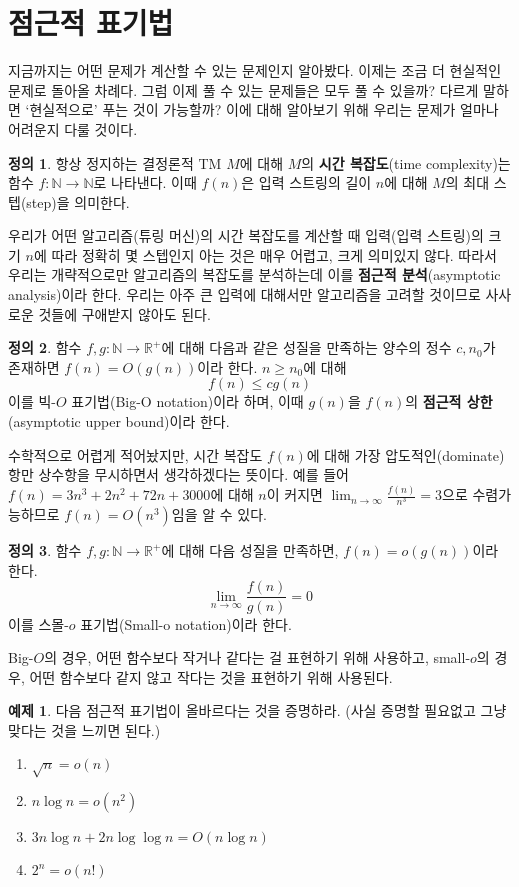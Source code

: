 \documentclass[b5paper]{book}
\theoremstyle{definition}
\newtheorem{defn}{정의}[chapter]
\newtheorem{ex}{예제}[chapter]
\begin{document}
\section{점근적 표기법}
지금까지는 어떤 문제가 계산할 수 있는 문제인지 알아봤다. 이제는 조금 더 현실적인 문제로 돌아올 차례다.
그럼 이제 풀 수 있는 문제들은 모두 풀 수 있을까? 다르게 말하면
`현실적으로' 푸는 것이 가능할까? 이에 대해 알아보기 위해 우리는 문제가 얼마나 어려운지 다룰 것이다.
\begin{defn}
    항상 정지하는 결정론적 TM $M$에 대해 $M$의 \textbf{시간 복잡도}(time complexity)는 함수 $f:
    \mathbb{N} \rightarrow \mathbb{N}$로 나타낸다. 이때 $f(n)$은 입력 스트링의 길이 $n$에 대해
    $M$의 최대 스텝(step)을 의미한다.
\end{defn}
우리가 어떤 알고리즘(튜링 머신)의 시간 복잡도를 계산할 때 입력(입력 스트링)의 크기 $n$에 따라 정확히
몇 스텝인지 아는 것은 매우 어렵고, 크게 의미있지 않다. 따라서 우리는 
개략적으로만 알고리즘의 복잡도를 분석하는데
이를 \textbf{점근적 분석}(asymptotic analysis)이라 한다. 우리는 아주 큰 입력에 
대해서만 알고리즘을 고려할 것이므로
사사로운 것들에 구애받지 않아도 된다. 
\begin{defn}
    함수 $f, g : \mathbb{N} \rightarrow \mathbb{R}^{+}$에 대해 다음과 같은 성질을 만족하는 
    양수의 정수 $c, n_0$가 존재하면 $f(n) = O(g(n))$이라 한다. $n \ge n_0$에 대해
    $$f(n) \le cg(n)$$
    이를 빅-$O$ 표기법(Big-O notation)이라 하며, 
    이때 $g(n)$을 $f(n)$의 \textbf{점근적 상한} (asymptotic upper bound)이라 한다.
\end{defn}
수학적으로 어렵게 적어놨지만, 시간 복잡도 $f(n)$에 대해 가장 압도적인(dominate) 항만 상수항을 무시하면서
 생각하겠다는 뜻이다.
예를 들어 $f(n) = 3n^3 + 2n^2 +72n + 3000$에 대해 $n$이 커지면 $\lim_{n \rightarrow \infty} 
\frac{f(n)}{n^3} = 3$으로 수렴가능하므로
$f(n) = O(n^3)$임을 알 수 있다. 
\begin{defn}
    함수 $f,g : \mathbb{N} \rightarrow \mathbb{R}^{+}$에 대해 다음 성질을 만족하면,
    $f(n) = o(g(n))$이라 한다. 
    $$\lim_{n\rightarrow \infty} \frac{f(n)}{g(n)} = 0$$
    이를 스몰-$o$ 표기법(Small-o notation)이라 한다. 
\end{defn}
Big-$O$의 경우, 어떤 함수보다 작거나 같다는 걸 표현하기 위해 사용하고, small-$o$의 경우,
어떤 함수보다 같지 않고 작다는 것을 표현하기 위해 사용된다. 
\begin{ex}
    다음 점근적 표기법이 올바르다는 것을 증명하라. (사실 증명할 필요없고 그냥 맞다는 것을 느끼면 된다.)
    \begin{enumerate}
        \item $\sqrt{n} = o(n)$
        \item $n\log{n} = o(n^2)$
        \item $3n\log{n} + 2n\log{\log{n}} = O(n\log{n})$
        \item $2^n = o(n!)$ 
    \end{enumerate}
\end{ex}
\end{document}
